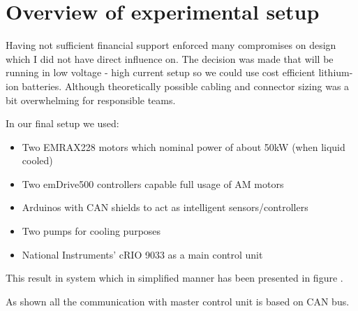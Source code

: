 \chapter{Overview of experimental setup}
Having not sufficient financial support enforced many compromises on design which I did not have direct influence on. The decision was made that will be running in low voltage - high current setup so we could use cost efficient lithium-ion batteries. 
Although theoretically possible cabling and connector sizing was a bit overwhelming for responsible teams.

In our final setup we used:
\begin{itemize}
    \item Two EMRAX228 motors which nominal power of about 50kW (when liquid cooled)
    \item Two emDrive500 controllers capable full usage of AM motors
    \item Arduinos with CAN shields to act as intelligent sensors/controllers
    \item Two  pumps for cooling purposes
    \item National Instruments' cRIO 9033 as a main control unit
\end{itemize}

This result in system which in simplified manner has been presented in figure .


As shown all the communication with master control unit is based on CAN bus. 